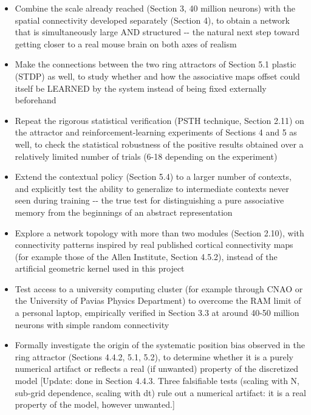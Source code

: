 \documentclass[
  english,
]{article}
\begin{document}
\begin{itemize}
\item
  Combine the scale already reached (Section 3, 40 million neurons) with the spatial connectivity developed separately (Section 4), to obtain a network that is simultaneously large AND structured -\/- the natural next step toward getting closer to a real mouse brain on both axes of realism
\item
  Make the connections between the two ring attractors of Section 5.1 plastic (STDP) as well, to study whether and how the associative map\textquotesingle s offset could itself be LEARNED by the system instead of being fixed externally beforehand
\item
  Repeat the rigorous statistical verification (PSTH technique, Section 2.11) on the attractor and reinforcement-learning experiments of Sections 4 and 5 as well, to check the statistical robustness of the positive results obtained over a relatively limited number of trials (6-18 depending on the experiment)
\item
  Extend the contextual policy (Section 5.4) to a larger number of contexts, and explicitly test the ability to generalize to intermediate contexts never seen during training -\/- the true test for distinguishing a pure associative memory from the beginnings of an abstract representation
\item
  Explore a network topology with more than two modules (Section 2.10), with connectivity patterns inspired by real published cortical connectivity maps (for example those of the Allen Institute, Section 4.5.2), instead of the artificial geometric kernel used in this project
\item
  Test access to a university computing cluster (for example through CNAO or the University of Pavia\textquotesingle s Physics Department) to overcome the RAM limit of a personal laptop, empirically verified in Section 3.3 at around 40-50 million neurons with simple random connectivity
\item
  Formally investigate the origin of the systematic position bias observed in the ring attractor (Sections 4.4.2, 5.1, 5.2), to determine whether it is a purely numerical artifact or reflects a real (if unwanted) property of the discretized model {[}Update: done in Section 4.4.3. Three falsifiable tests (scaling with N, sub-grid dependence, scaling with dt) rule out a numerical artifact: it is a real property of the model, however unwanted.{]}
\end{itemize}
\end{document}
